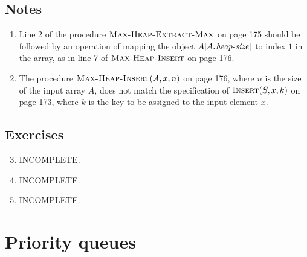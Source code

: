 \subsection*{Notes}
\begin{enumerate}[1.]
%
\item Line 2 of the procedure $\textnormal{\scshape Max-Heap-Extract-Max}$ on page 175 should be followed by an operation of mapping the object $A[\attrib{A}{heap-size}]$ to index $1$ in the array, as in line 7 of $\textnormal{\scshape Max-Heap-Insert}$ on page 176.
%
\item The procedure $\textnormal{\scshape Max-Heap-Insert}(A, x, n)$ on page 176, where $n$ is the size of the input array $A$, does not match the specification of $\textnormal{\scshape Insert}(S, x, k)$ on page 173, where $k$ is the key to be assigned to the input element $x$.
%
\end{enumerate}

\subsection*{Exercises}
\begin{enumerate}[\thesection-1]
%
\setcounter{enumi}{2}
%
\item INCOMPLETE.
%
\item INCOMPLETE.
%
\item INCOMPLETE.
%
\end{enumerate}


\section{Priority queues}
